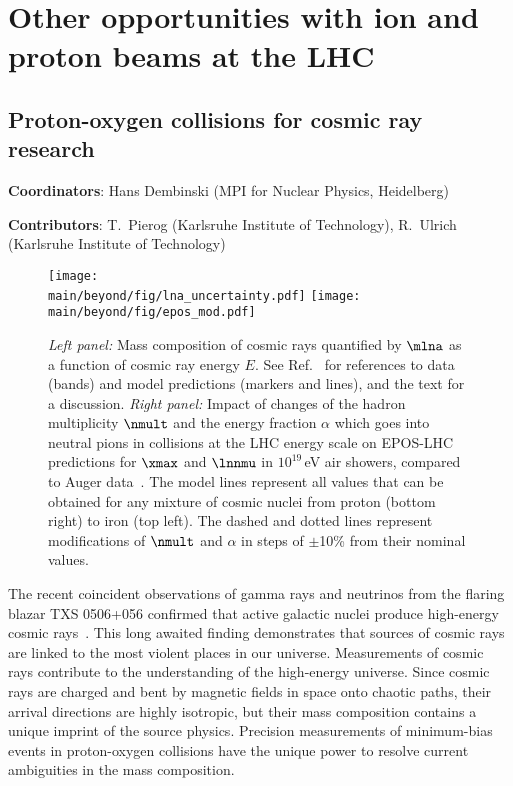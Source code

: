 \documentclass[../report.tex]{subfiles}
\providecommand{\main}{..}
\begin{document}
\section{Other opportunities with ion and proton beams at the LHC}


\clearpage




\clearpage
\subsection{Proton-oxygen collisions for cosmic ray research}
\label{sec:pOcosmic}
{ \small
\noindent \textbf{Coordinators}: Hans Dembinski (MPI for Nuclear Physics, Heidelberg)

\noindent \textbf{Contributors}: 
T.~Pierog (Karlsruhe Institute of Technology), 
R.~Ulrich (Karlsruhe Institute of Technology)
}

\begin{figure}
\texttt{[image: \\main/beyond/fig/lna\_uncertainty.pdf]}
\texttt{[image: \\main/beyond/fig/epos\_mod.pdf]}
\caption{\emph{Left panel:} Mass composition of cosmic rays quantified by $\mlna$ as a function of cosmic ray energy $E$. See Ref.~\cite{kampert_cr_review} for references to data (bands) and model predictions (markers and lines), and the text for a discussion. \emph{Right panel:} Impact of changes of the hadron multiplicity $\nmult$ and the energy fraction $\alpha$ which goes into neutral pions in collisions at the LHC energy scale on EPOS-LHC predictions for $\xmax$ and $\lnnmu$ in $10^{19}$\,\si{eV} air showers, compared to Auger data~\cite{Aab:2014pza}. The model lines represent all values that can be obtained for any mixture of cosmic nuclei from proton (bottom right) to iron (top left). The dashed and dotted lines represent modifications of $\nmult$ and $\alpha$ in steps of $\pm$10\% from their nominal values.}
\label{fig:cosmic_rays}
\end{figure}

The recent coincident observations of gamma rays and neutrinos from the flaring blazar TXS 0506+056 confirmed that active galactic nuclei produce high-energy cosmic rays~\cite{IceCube:2018dnn}. This long awaited finding demonstrates that sources of cosmic rays are linked to the most violent places in our universe. Measurements of cosmic rays contribute to the understanding of the high-energy universe. Since cosmic rays are charged and bent by magnetic fields in space onto chaotic paths, their arrival directions are highly isotropic, but their mass composition contains a unique imprint of the source physics. Precision measurements of minimum-bias events in proton-oxygen collisions have the unique power to resolve current ambiguities in the mass composition.
\end{document}
